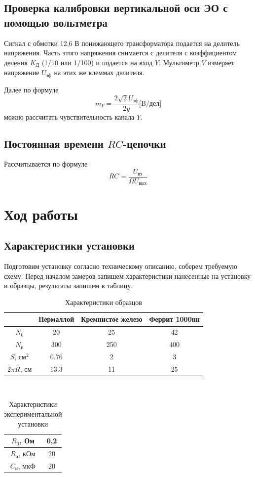 \documentclass[a4paper, 12pt]{article}%
\begin{document}
	\subsection*{Проверка калибровки вертикальной оси ЭО с помощью вольтметра}
	Сигнал с обмотки 12,6 В понижающего трансформатора подается на делитель напряжения. Часть этого напряжения снимается с делителя с коэффициентом деления $K_{\text{Д}}$ (1/10 или 1/100) и подается на вход $Y$. Мультиметр $V$ измеряет напряжение $U_{\text{эф}}$ на этих же клеммах делителя.
	
	Далее по формуле 
	\begin{equation}
		m_Y = \dfrac{2\sqrt{2}U_{\text{эф}}}{2y} \text{[B/дел]}
	\end{equation}
	можно рассчитать чувствительность канала $Y$.
	\subsection*{Постоянная времени $RC$-цепочки}
	Рассчитывается по формуле 
	\begin{equation}
		RC = \dfrac{U_{\text{вх}}}{\Omega U_{\text{вых}}}
	\end{equation}
	\section{Ход работы}
	\subsection*{Характеристики установки}
	Подготовим установку согласно техническому описанию, соберем требуемую схему.
	Перед началом замеров запишем характеристики нанесенные на установку и образцы, результаты запишем в таблицу.
	\begin{table}[H]
		\centering
		\begin{tabular}{|c|c|c|c|}
			\hline
			& Пермаллой & Кремнистое железо & Феррит 1000нн \\ \hline
			$N_0$ & 20 & 25 & 42 \\ \hline
			$N_{\text{и}}$ & 300 & 250 & 400 \\ \hline
			$S$, см$^2$ & 0.76 & 2 & 3 \\ \hline
			$2\pi R$, см & 13.3 & 11 & 25 \\ \hline
		\end{tabular}\\
		\caption{Характеристики образцов}
	\end{table}
	\begin{table}[H]
		\centering
		\begin{tabular}{|c|c|}
			\hline
			$R_0$, Ом & 0,2 \\ \hline
			$R_{\text{и}}$, кОм & 20 \\ \hline
			$C_{\text{и}}$, мкФ & 20 \\ \hline
		\end{tabular}\\
		\caption{Характеристики экспериментальной установки}
	\end{table}
\end{document}
